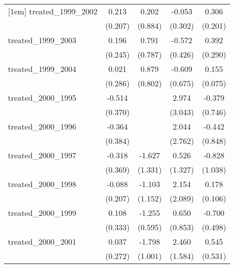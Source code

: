 {\begin{tabular}{l*{4}{c}}
[1em]
treated\_1999\_2002&       0.213         &       0.202         &      -0.053         &       0.306         \\
            &     (0.207)         &     (0.884)         &     (0.302)         &     (0.201)         \\
[1em]
treated\_1999\_2003&       0.196         &       0.791         &      -0.572         &       0.392         \\
            &     (0.245)         &     (0.787)         &     (0.426)         &     (0.290)         \\
[1em]
treated\_1999\_2004&       0.021         &       0.879         &      -0.609         &       0.155\sym{*}  \\
            &     (0.286)         &     (0.802)         &     (0.675)         &     (0.075)         \\
[1em]
treated\_2000\_1995&      -0.514         &                     &       2.974         &      -0.379         \\
            &     (0.370)         &                     &     (3.043)         &     (0.746)         \\
[1em]
treated\_2000\_1996&      -0.364         &                     &       2.044         &      -0.442         \\
            &     (0.384)         &                     &     (2.762)         &     (0.848)         \\
[1em]
treated\_2000\_1997&      -0.318         &      -1.627         &       0.526         &      -0.828         \\
            &     (0.369)         &     (1.331)         &     (1.327)         &     (1.038)         \\
[1em]
treated\_2000\_1998&      -0.088         &      -1.103         &       2.154         &       0.178         \\
            &     (0.207)         &     (1.152)         &     (2.089)         &     (0.106)         \\
[1em]
treated\_2000\_1999&       0.108         &      -1.255\sym{*}  &       0.650         &      -0.700         \\
            &     (0.333)         &     (0.595)         &     (0.853)         &     (0.498)         \\
[1em]
treated\_2000\_2001&       0.037         &      -1.798         &       2.460         &       0.545         \\
            &     (0.272)         &     (1.001)         &     (1.584)         &     (0.531)         \\

\end{tabular}}
